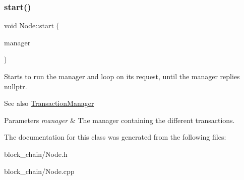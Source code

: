 \subsubsection{\texorpdfstring{start()}{start()}}
{\footnotesize\ttfamily void Node\+::start (\begin{DoxyParamCaption}\item[{\mbox{\hyperlink{classTransactionManager}{Transaction\+Manager}}}]{manager }\end{DoxyParamCaption})}

Starts to run the manager and loop on its request, until the manager replies nullptr. \begin{DoxySeeAlso}{See also}
\mbox{\hyperlink{classTransactionManager}{Transaction\+Manager}}
\end{DoxySeeAlso}

\begin{DoxyParams}{Parameters}
{\em manager} & The manager containing the different transactions. \\
\hline
\end{DoxyParams}


The documentation for this class was generated from the following files\+:\begin{DoxyCompactItemize}
\item 
block\+\_\+chain/Node.\+h\item 
block\+\_\+chain/Node.\+cpp\end{DoxyCompactItemize}
